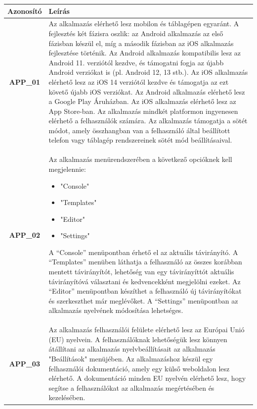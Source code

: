 \documentclass{article}
\begin{document}
\begin{longtable}{|c|p{14cm}|}
\hline
\textbf{Azonosító} & \textbf{Leírás}        \\ 
\hline
       \textbf{APP\_01}  & Az alkalmazás elérhető lesz mobilon és táblagépen egyaránt. A fejlesztés két fázisra oszlik: az Android alkalmazás az első fázisban készül el, míg a második fázisban az iOS alkalmazás fejlesztése történik.
       Az Android alkalmazás kompatibilis lesz az Android 11. verziótól kezdve, és támogatni fogja az újabb Android verziókat is (pl. Android 12, 13 stb.). Az iOS alkalmazás elérhető lesz az iOS 14 verziótól kezdve és támogatja az ezt követő újabb iOS verziókat.
       Az Android alkalmazás elérhető lesz a Google Play Áruházban. Az iOS alkalmazás elérhető lesz az App Store-ban. Az alkalmazás mindkét platformon ingyenesen elérhető a felhasználók számára.
       Az alkalmazás támogatja a sötét módot, amely összhangban van a felhasználó által beállított telefon vagy táblagép rendszereinek sötét mód beállításaival. \\\hline
       
       \textbf{APP\_02}  & Az alkalmazás menürendszerében a következő opcióknek kell megjelennie:
       \begin{itemize}
       \item "Console"
       \item "Templates"
       \item "Editor"
       \item "Settings"
       \end{itemize}
       A “Console” menüpontban érhető el az aktuális távirányító. A “Templates” menüben láthatja a felhasználó az összes korábban mentett távirányítót, lehetőség van egy távirányíttót aktuális távirányítóvá választani és kedvencekként megjelölni ezeket. Az “Editor” menüpontban készíthet a felhasználó új távirányítókat és  szerkeszthet már meglévőket. A “Settings” menüpontban az alkalmazás nyelvének módosítása lehetséges. \\\hline
       
       \textbf{APP\_03}  & Az alkalmazás felhasználói felülete elérhető lesz az Európai Unió (EU) nyelvein. A felhasználóknak lehetőségük lesz könnyen átállítani az alkalmazás nyelvbeállításait az alkalmazás "Beállítások" menüjében. Az alkalmazáshoz készül egy felhasználói dokumentáció, amely egy külső weboldalon lesz elérhető. A dokumentáció minden EU nyelvén elérhető lesz, hogy segítse a felhasználókat az alkalmazás megértésében és kezelésében.  \\\hline
       

\end{longtable}
\end{document}
